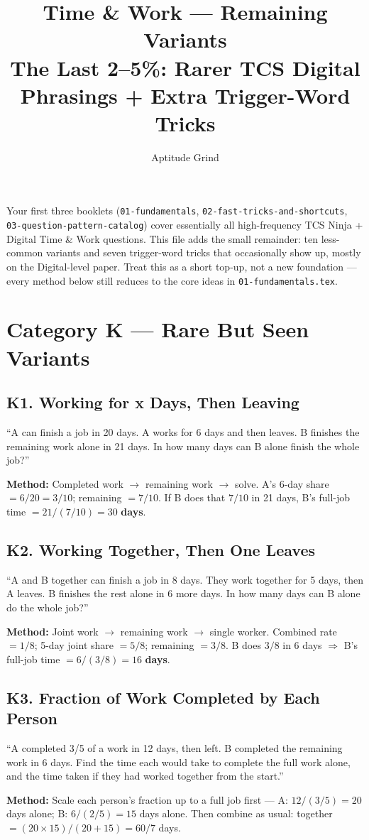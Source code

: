 \documentclass[11pt]{article}
\title{\color{primary}\textbf{Time \& Work --- Remaining Variants}\\[4pt]\large The Last 2--5\%: Rarer TCS Digital Phrasings + Extra Trigger-Word Tricks}
\author{Aptitude Grind}
\date{}
\begin{document}
\maketitle
\thispagestyle{fancy}

\noindent Your first three booklets (\texttt{01-fundamentals}, \texttt{02-fast-tricks-and-shortcuts},
\texttt{03-question-pattern-catalog}) cover essentially all high-frequency TCS Ninja + Digital Time \&
Work questions. This file adds the small remainder: ten less-common variants and seven trigger-word
tricks that occasionally show up, mostly on the Digital-level paper. Treat this as a short top-up,
not a new foundation --- every method below still reduces to the core ideas in
\texttt{01-fundamentals.tex}.

\section*{Category K --- Rare But Seen Variants}

\subsection*{K1. Working for x Days, Then Leaving}
\begin{tipbox}[Phrasing]
``A can finish a job in 20 days. A works for 6 days and then leaves. B finishes the remaining work
alone in 21 days. In how many days can B alone finish the whole job?''
\end{tipbox}
\textbf{Method:} Completed work $\to$ remaining work $\to$ solve. A's 6-day share $=6/20=3/10$;
remaining $=7/10$. If B does that $7/10$ in 21 days, B's full-job time $=21/(7/10)=30$ \textbf{days}.

\subsection*{K2. Working Together, Then One Leaves}
\begin{tipbox}[Phrasing]
``A and B together can finish a job in 8 days. They work together for 5 days, then A leaves. B
finishes the rest alone in 6 more days. In how many days can B alone do the whole job?''
\end{tipbox}
\textbf{Method:} Joint work $\to$ remaining work $\to$ single worker. Combined rate $=1/8$; 5-day
joint share $=5/8$; remaining $=3/8$. B does $3/8$ in 6 days $\Rightarrow$ B's full-job time
$=6/(3/8)=16$ \textbf{days}.

\subsection*{K3. Fraction of Work Completed by Each Person}
\begin{tipbox}[Phrasing]
``A completed 3/5 of a work in 12 days, then left. B completed the remaining work in 6 days. Find the
time each would take to complete the full work alone, and the time taken if they had worked together
from the start.''
\end{tipbox}
\textbf{Method:} Scale each person's fraction up to a full job first --- A: $12/(3/5)=20$ days alone;
B: $6/(2/5)=15$ days alone. Then combine as usual: together $=(20\times15)/(20+15)=60/7$ days.
\end{document}
